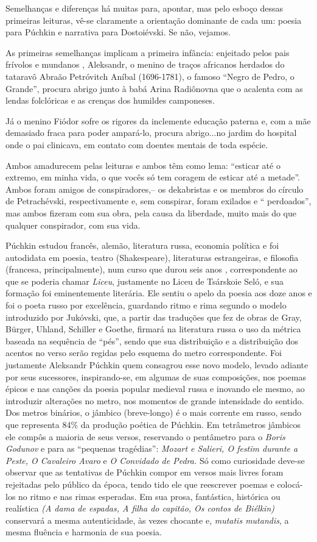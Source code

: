 Semelhanças e diferenças há muitas para, apontar, mas pelo esboço dessas
primeiras leituras, vê-se claramente a orientação dominante de cada um:
poesia para Púchkin e narrativa para Dostoiévski. Se não, vejamos.

As primeiras semelhanças implicam a primeira infância: enjeitado pelos
pais frívolos e mundanos , Aleksandr, o menino de traços africanos
herdados do tataravô Abraão Petróvitch Aníbal (1696-1781), o famoso
``Negro de Pedro, o Grande'', procura abrigo junto à babá Arina
Radiônovna que o acalenta com as lendas folclóricas e as crenças dos
humildes camponeses.

Já o menino Fiódor sofre os rigores da inclemente educação paterna e,
com a mãe demasiado fraca para poder ampará-lo, procura abrigo...no
jardim do hospital onde o pai clinicava, em contato com doentes mentais
de toda espécie.

Ambos amadurecem pelas leituras e ambos têm como lema: ``esticar até o
extremo, em minha vida, o que vocês só tem coragem de esticar até a
metade''. Ambos foram amigos de conspiradores,-- os dekabristas e os
membros do círculo de Petrachévski, respectivamente e, sem conspirar,
foram exilados e `` perdoados'', mas ambos fizeram com sua obra, pela
causa da liberdade, muito mais do que qualquer conspirador, com sua
vida.

Púchkin estudou francês, alemão, literatura russa, economia política e
foi autodidata em poesia, teatro (Shakespeare), literaturas
estrangeiras, e filosofia (francesa, principalmente), num curso que
durou seis anos , correspondente ao que se poderia chamar \emph{Liceu},
justamente no Liceu de Tsárskoie Seló, e sua formação foi eminentemente
literária. Ele sentiu o apelo da poesia aos doze anos e foi o poeta
russo por excelência, guardando ritmo e rima segundo o modelo
introduzido por Jukóvski, que, a partir das traduções que fez de obras
de Gray, Bürger, Uhland, Schiller e Goethe, firmará na literatura russa
o uso da métrica baseada na sequência de ``pés'', sendo que sua
distribuição e a distribuição dos acentos no verso serão regidas pelo
esquema do metro correspondente. Foi justamente Aleksandr Púchkin quem
consagrou esse novo modelo, levado adiante por seus sucessores,
inspirando-se, em algumas de suas composições, nos poemas épicos e nas
canções da poesia popular medieval russa e inovando ele mesmo, ao
introduzir alterações no metro, nos momentos de grande intensidade do
sentido. Dos metros binários, o jâmbico (breve-longo) é o mais corrente
em russo, sendo que representa 84\% da produção poética de Púchkin. Em
tetrâmetros jâmbicos ele compôs a maioria de seus versos, reservando o
pentâmetro para o \emph{Boris Godunov} e para as ``pequenas tragédias'':
\emph{Mozart e Salieri, O festim durante a Peste, O Cavaleiro Avaro} e
\emph{O Convidado de Pedra.} Só como curiosidade deve-se observar que as
tentativas de Púchkin compor em versos mais livres foram rejeitadas pelo
público da época, tendo tido ele que reescrever poemas e colocá-los no
ritmo e nas rimas esperadas. Em sua prosa, fantástica, histórica ou
realística \emph{(A dama de espadas, A filha do capitão, Os contos de
Biélkin)} conservará a mesma autenticidade, às vezes chocante e,
\emph{mutatis mutandis}, a mesma fluência e harmonia de sua poesia.

